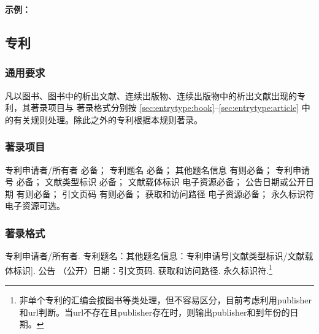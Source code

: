 \documentclass[twoside]{article}%
\begin{document}
\begin{refsection}

\nocite{全国信息文献标准化技术委员会2010-3-3}
\nocite{全国广播电视标准化技术委员会2007-1-1}
\nocite{水电水利2020,国家环境保护局科技标准司1996-2-3,
中国铁建2021,华北水利2022,网络安全2021,国家标准局信息分类编码研究所1988-59-92}
\nocite{Auditdata2019,Softwareinterface2021,
Informationtechnology2020,Lithiumbattery2022,
Explosiveatmospheres2016,Atmospheresexplosives2016}


\textbf{示例：}

{\printbibliography[heading=none,env=indentegenv]}
\end{refsection}


\subsection{专利}\label{sec:entrytype:patent}

\subsubsection{通用要求}

凡以图书、图书中的析出文献、连续出版物、连续出版物中的析出文献出现的专利，其著录项目与
著录格式分别按 \ref{sec:entrytype:book}--\ref{sec:entrytype:article} 中的有关规则处理。除此之外的专利根据本规则著录。

\subsubsection{著录项目}

专利申请者/所有者 必备；
专利题名 必备；
其他题名信息 有则必备；
专利申请号 必备；
文献类型标识 必备；
文献载体标识 电子资源必备；
公告日期或公开日期 有则必备；
引文页码 有则必备；
获取和访问路径 电子资源必备；
永久标识符 电子资源可选。

\subsubsection{著录格式}

专利申请者/所有者. 专利题名：其他题名信息：专利申请号[文献类型标识/文献载体标识]. 公告
（公开）日期：引文页码. 获取和访问路径. 永久标识符.\footnote{非单个专利的汇编会按图书等类处理，但不容易区分，目前考虑利用publisher和url判断。当url不存在且publisher存在时，则输出publisher和到年份的日期。}


\end{document}
